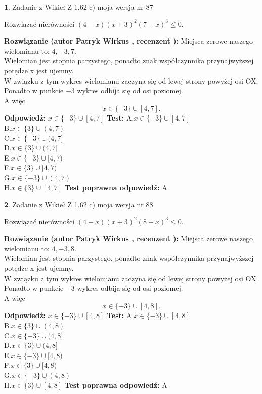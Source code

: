 \documentclass[12pt, a4paper]{article}
\theoremstyle{definition} %
\newtheorem{zad}{}
\newcommand{\zadStart}[1]{\begin{zad}#1\newline}
\newcommand{\zadStop}{\end{zad}}
\newcommand{\rozwStart}[2]{\noindent \textbf{Rozwiązanie (autor #1 , recenzent #2): }\newline}
\newcommand{\rozwStop}{\newline}
\newcommand{\odpStart}{\noindent \textbf{Odpowiedź:}\newline}
\newcommand{\odpStop}{\newline}
\newcommand{\testStart}{\noindent \textbf{Test:}\newline}
\newcommand{\testStop}{\newline}
\newcommand{\kluczStart}{\noindent \textbf{Test poprawna odpowiedź:}\newline}
\newcommand{\kluczStop}{\newline}
\begin{document}
\zadStart{Zadanie z Wikieł Z 1.62 c) moja wersja nr 87}

Rozwiązać nierówności $(4-x)(x+3)^{2}(7-x)^{3}\le0$.
\zadStop
\rozwStart{Patryk Wirkus}{}
Miejsca zerowe naszego wielomianu to: $4, -3, 7$.\\
Wielomian jest stopnia parzystego, ponadto znak współczynnika przy\linebreak najwyższej potędze x jest ujemny.\\ W związku z tym wykres wielomianu zaczyna się od lewej strony powyżej osi OX.\\
Ponadto w punkcie $-3$ wykres odbija się od osi poziomej.\\
A więc $$x \in \{-3\} \cup [4,7].$$
\rozwStop
\odpStart
$x \in \{-3\} \cup [4,7]$
\odpStop
\testStart
A.$x \in \{-3\} \cup [4,7]$\\
B.$x \in \{3\} \cup (4,7)$\\
C.$x \in \{-3\} \cup (4,7]$\\
D.$x \in \{3\} \cup (4,7]$\\
E.$x \in \{-3\} \cup [4,7)$\\
F.$x \in \{3\} \cup [4,7)$\\
G.$x \in \{-3\} \cup (4,7)$\\
H.$x \in \{3\} \cup [4,7]$
\testStop
\kluczStart
A
\kluczStop



\zadStart{Zadanie z Wikieł Z 1.62 c) moja wersja nr 88}

Rozwiązać nierówności $(4-x)(x+3)^{2}(8-x)^{3}\le0$.
\zadStop
\rozwStart{Patryk Wirkus}{}
Miejsca zerowe naszego wielomianu to: $4, -3, 8$.\\
Wielomian jest stopnia parzystego, ponadto znak współczynnika przy\linebreak najwyższej potędze x jest ujemny.\\ W związku z tym wykres wielomianu zaczyna się od lewej strony powyżej osi OX.\\
Ponadto w punkcie $-3$ wykres odbija się od osi poziomej.\\
A więc $$x \in \{-3\} \cup [4,8].$$
\rozwStop
\odpStart
$x \in \{-3\} \cup [4,8]$
\odpStop
\testStart
A.$x \in \{-3\} \cup [4,8]$\\
B.$x \in \{3\} \cup (4,8)$\\
C.$x \in \{-3\} \cup (4,8]$\\
D.$x \in \{3\} \cup (4,8]$\\
E.$x \in \{-3\} \cup [4,8)$\\
F.$x \in \{3\} \cup [4,8)$\\
G.$x \in \{-3\} \cup (4,8)$\\
H.$x \in \{3\} \cup [4,8]$
\testStop
\kluczStart
A
\kluczStop
\end{document}
